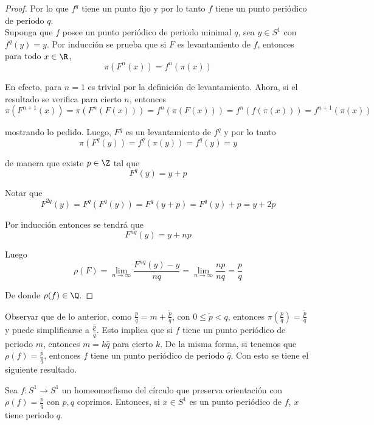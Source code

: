 \documentclass[	docname= Sistemas\ Din\'amicos,
				finished=1,
				semester=1,
				year=2017,
				professor=Godofredo\ Iommi,
				sigla=MAT2565]{apunte}
\begin{document}
\begin{proof}
Por lo que $f^{q}$ tiene un punto fijo y por lo tanto $f$ tiene un punto periódico de periodo $q$.	\\

\iffdem{\Longleftarrow}
Suponga que $f$ posee un punto periódico de periodo minimal $q$, sea $y \in S^{1}$ con $f^{q}(y) = y$. Por inducción se prueba que si $F$ es levantamiento de $f$, entonces para todo $x \in \R$,
	$$\pi(F^{n}(x)) = f^{n}(\pi(x))$$

En efecto, para $n = 1$ es trivial por la definición de levantamiento. Ahora, si el resultado se verifica para cierto $n$, entonces
	$$\pi(F^{n+1}(x)) = \pi(F^{n}(F(x))) = f^{n}(\pi(F(x))) = f^{n}(f(\pi(x))) = f^{n+1}(\pi(x))$$

mostrando lo pedido. Luego, $F^{q}$ es un levantamiento de $f^{q}$ y por lo tanto
	$$\pi(F^{q}(y)) = f^{q}(\pi(y)) = f^{q}(y) = y$$

de manera que existe $p \in \Z$ tal que
	$$F^{q}(y) = y + p$$

Notar que
	$$F^{2q}(y) = F^{q}(F^{q}(y)) = F^{q}(y + p) = F^{q}(y) + p = y + 2p$$

Por inducción entonces se tendrá que
	$$F^{nq}(y) = y + np$$

Luego
	$$\rho(F) = \lim_{n \to \infty} \frac{F^{nq}(y) - y}{nq} = \lim_{n \to \infty} \frac{np}{nq} = \frac{p}{q} $$

De donde $\rho(f) \in \Q$.
\end{proof}

Observar que de lo anterior, como $\frac{p}{q} = m + \frac{\tilde{p}}{q}$, con $0 \leq \tilde{p} < q$, entonces $\pi\left(\frac{p}{q}\right) = \frac{\tilde{p}}{q}$ y puede simplificarse a $\frac{\hat{p}}{\hat{q}}$. Esto implica que si $f$ tiene un punto periódico de periodo $m$, entonces $m = k\hat{q}$ para cierto $k$. De la misma forma, si tenemos que $\rho(f) = \frac{\hat{p}}{\hat{q}}$, entonces $f$ tiene un punto periódico de periodo $\hat{q}$. Con esto se tiene el siguiente resultado.

\begin{prop} Sea $f: S^{1} \to S^{1}$ un homeomorfismo del círculo que preserva orientación con $\rho(f) = \frac{p}{q}$ con $p,q$ coprimos. Entonces, si $x \in S^{1}$ es un punto periódico de $f$, $x$ tiene periodo $q$. 
\end{prop}
\end{document}
